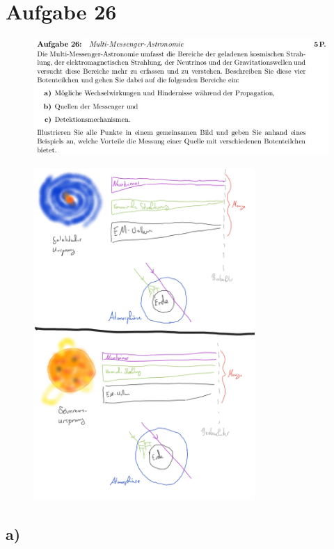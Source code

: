 \section{Aufgabe 26}
\begin{figure}[H]
    \centering
    \includegraphics[width=\textwidth]{images/ex26.jpg}
\end{figure}

\begin{figure}[H]
    \centering
    \includegraphics[width=0.75\textwidth]{images/Messenger.jpg}
\end{figure}

\subsection{a)}


